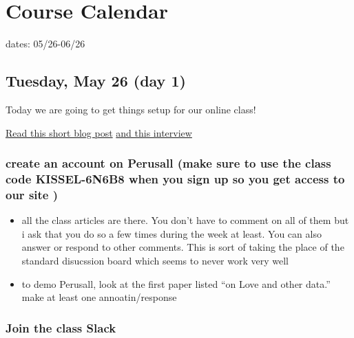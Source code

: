 \documentclass[]{tufte-handout}
\providecommand{\tightlist}{%
  \setlength{\itemsep}{0pt}\setlength{\parskip}{0pt}}
\begin{document}
\hypertarget{course-calendar}{%
\section{Course Calendar}\label{course-calendar}}

dates: 05/26-06/26

\hypertarget{tuesday-may-26-day-1}{%
\subsection{Tuesday, May 26 (day 1)}\label{tuesday-may-26-day-1}}

Today we are going to get things setup for our online class!

\href{https://beta.capeia.com/paleobiology/2019/09/28/braided-streams-evolutionary-dynamics-among-pleistocene-hominins-in-east-asia-and-the-evolution-of-homo-sapiens}{Read
this short blog post}
\href{https://gizmodo.com/this-philosopher-is-challenging-all-of-evolutionary-psy-1842248835}{and
this interview}

\hypertarget{create-an-account-on-perusall-make-sure-to-use-the-class-code-kissel-6n6b8-when-you-sign-up-so-you-get-access-to-our-site}{%
\subsubsection{create an account on Perusall (make sure to use the class
code KISSEL-6N6B8 when you sign up so you get access to our site
)}\label{create-an-account-on-perusall-make-sure-to-use-the-class-code-kissel-6n6b8-when-you-sign-up-so-you-get-access-to-our-site}}

\begin{itemize}
\tightlist
\item
  all the class articles are there. You don't have to comment on all of
  them but i ask that you do so a few times during the week at least.
  You can also answer or respond to other comments. This is sort of
  taking the place of the standard disucssion board which seems to never
  work very well
\item
  to demo Perusall, look at the first paper listed ``on Love and other
  data.'' make at least one annoatin/response
\end{itemize}

\hypertarget{join-the-class-slack}{%
\subsubsection{Join the class Slack}\label{join-the-class-slack}}
\end{document}
